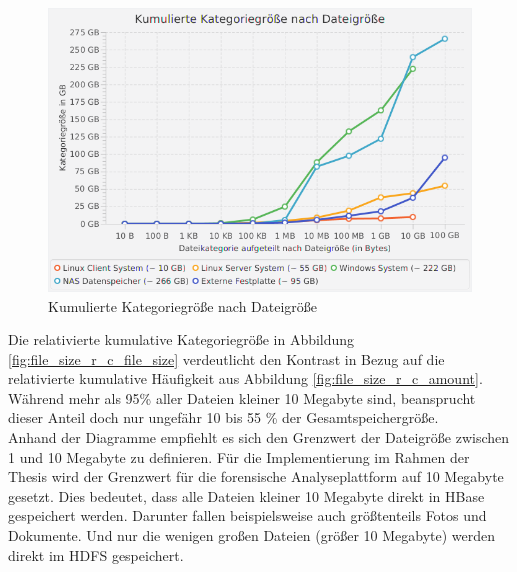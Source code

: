  \begin{figure}[ht]
  \centering
  \includegraphics[width=\textwidth]{./resource/fileSize_cumulatedCategorieSize.png}
  \caption{Kumulierte Kategoriegröße nach Dateigröße}
  \label{fig:file_size_c_file_size}
\end{figure}

\noindent
Die relativierte kumulative Kategoriegröße in Abbildung \ref{fig:file_size_r_c_file_size} verdeutlicht den Kontrast in Bezug auf die relativierte kumulative Häufigkeit aus Abbildung \ref{fig:file_size_r_c_amount}. Während mehr als 95\% aller Dateien kleiner 10 Megabyte sind, beansprucht dieser Anteil doch nur ungefähr 10 bis 55 \% der Gesamtspeichergröße.\\

\noindent
Anhand der Diagramme empfiehlt es sich den Grenzwert der Dateigröße zwischen 1 und 10 Megabyte zu definieren. Für die Implementierung im Rahmen der Thesis wird der Grenzwert für die forensische Analyseplattform auf 10 Megabyte gesetzt. Dies bedeutet, dass alle Dateien kleiner 10 Megabyte direkt in HBase gespeichert werden. Darunter fallen beispielsweise auch größtenteils Fotos und Dokumente. Und nur die wenigen großen Dateien (größer 10 Megabyte) werden direkt im HDFS gespeichert.  

